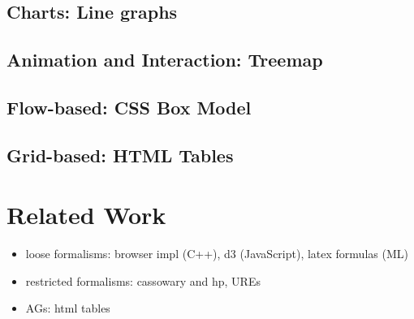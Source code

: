 \subsection{Charts: Line graphs}
\subsection{Animation and Interaction: Treemap}
\subsection{Flow-based: CSS Box Model}
\subsection{Grid-based: HTML Tables}

\section{Related Work}
\begin{itemize}
\item loose formalisms: browser impl (C++), d3 (JavaScript), latex formulas (ML)
\item restricted formalisms: cassowary and hp, UREs
\item AGs: html tables
\end{itemize}




